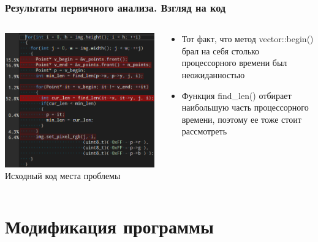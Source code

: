 \documentclass[10pt]{beamer}
\begin{document}
\begin{frame}
\frametitle{Результаты первичного анализа. Взгляд на код}


\begin{columns}[c]

\begin{center}
  \includegraphics[width=\textwidth]{res/img/AnalysisTargetWizard1CodeCropped.png}
  Исходный код места проблемы
\end{center}

\begin{block}{}
  \begin{itemize}
    \item Тот факт, что метод vector::begin() брал на себя столько процессорного времени был неожиданностью
    \item Функция find\_len() отбирает наибольшую часть процессорного времени, поэтому ее тоже стоит рассмотреть
  \end{itemize}
\end{block}

\end{columns}

\end{frame}



\section{Модификация программы}
\end{document}
